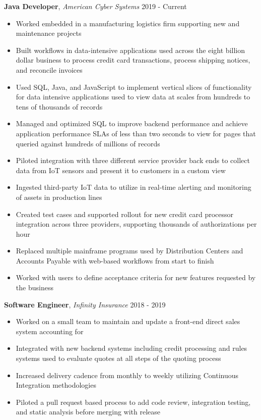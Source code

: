\documentclass[9pt]{article}
\newenvironment{changemargin}[2]{%
  \begin{list}{}{%
      \setlength{\topsep}{0pt}%
      \setlength{\leftmargin}{#1}%
      \setlength{\rightmargin}{#2}%
      \setlength{\listparindent}{\parindent}%
      \setlength{\itemindent}{\parindent}%
      \setlength{\parsep}{\parskip}%
    }%
  \item[]}{\end{list}
}
\newenvironment{body} {
  \vspace*{-16pt}
  \begin{changemargin}{-0.25in}{-0.5in}
  }	
  {\end{changemargin}
}
\begin{document}
\begin{body}
  \vspace{17pt}
  

  \textbf{Java Developer}, \emph{American Cyber Systems} \hfill 2019 - Current \\
  \vspace*{-4pt}
  \begin{itemize} \itemsep -0pt
  \item Worked embedded in a manufacturing logistics firm supporting new and maintenance projects
  \item Built workflows in data-intensive applications used across the eight billion dollar business to process credit card transactions, process shipping notices, and reconcile invoices
  \item Used SQL, Java, and JavaScript to implement vertical slices of functionality for data intensive applications used to view data at scales from hundreds to tens of thousands of records
  \item Managed and optimized SQL to improve backend performance and achieve application performance SLAs of less than two seconds to view for pages that queried against hundreds of millions of records
  \item Piloted integration with three different service provider back ends to collect data from IoT sensors and present it to customers in a custom view
  \item Ingested third-party IoT data to utilize in real-time alerting and monitoring of assets in production lines
  \item Created test cases and supported rollout for new credit card processor integration across three providers, supporting thousands of authorizations per hour
  \item Replaced multiple mainframe programs used by Distribution Centers and Accounts Payable with web-based workflows from start to finish
  \item Worked with users to define acceptance criteria for new features requested by the business
  \end{itemize}
  \vspace{17pt}
  

  \textbf{Software Engineer}, \emph{Infinity Insurance} \hfill 2018 - 2019 \\
  \vspace*{-4pt}
  \begin{itemize} \itemsep -0pt
  \item Worked on a small team to maintain and update a front-end direct sales system accounting for %
  \item Integrated with new backend systems including credit processing and rules systems used to evaluate quotes at all steps of the quoting process
  \item Increased delivery cadence from monthly to weekly utilizing Continuous Integration methodologies
  \item Piloted a pull request based process to add code review, integration testing, and static analysis before merging with release 
    


\end{itemize}
\end{body}
\end{document}
